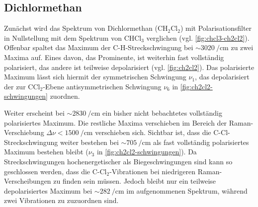 \documentclass[../bericht.tex]{subfiles}
\begin{document}
      \subsection{Dichlormethan}

        Zunächst wird das Spektrum von Dichlormethan ($\mathrm{CH_2Cl_2}$) mit Polarisationsfilter in Nullstellung mit dem Spektrum von $\mathrm{CHCl_3}$ verglichen (vgl. \cref{fig:chcl3-ch2cl2}). Offenbar spaltet das Maximum der C-H-Streckschwingung bei $\sim\SI{3020}{\per\centi\meter}$ zu zwei Maxima auf. Eines davon, das Prominente, ist weiterhin fast vollständig polarisiert, das andere ist teilweise depolarisiert (vgl. \cref{fig:ch2cl2}). Das polarisierte Maximum lässt sich hiermit der symmetrischen Schwingung $\nu_1$, das depolarisiert der zur $\mathrm{CCl_2}$-Ebene antisymmetrischen Schwingung $\nu_6$ in \cref{fig:ch2cl2-schwingungen} zuordnen.

        Weiter erscheint bei $\sim\SI{2830}{\per\centi\meter}$ ein bisher nicht bebachtetes vollständig polarisiertes Maximum. Die restliche Maxima verschieben im Bereich der Raman-Verschiebung $\Delta \nu < \SI{1500}{\per\centi\meter}$ verschieben sich. Sichtbar ist, dass die C-Cl-Streckschwingung weiter bestehen bei $\sim\SI{705}{\per\centi\meter}$ als fast vollständig polarisiertes Maximum bestehen bleibt ($\nu_3$ in \cref{fig:ch2cl2-schwingungen}). Da Streckschwingungen hochenergetischer als Biegeschwingungen sind kann so geschlossen werden, dass die C-$\mathrm{Cl_2}$-Vibrationen bei niedrigeren Raman-Verscheibungen zu finden sein müssen. Jedoch bleibt nur ein teilweise depolarisiertes Maximum bei $\sim\SI{282}{\per\centi\meter}$ im aufgenommenen Spektrum, während zwei Vibrationen zu zuzuordnen sind.
\end{document}
